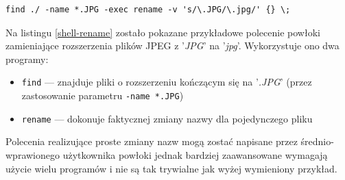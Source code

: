 \begin{lstlisting}[label=shell-rename, caption={Polecenie powłoki zmieniające roszerzenia plików JPEG}]
find ./ -name *.JPG -exec rename -v 's/\.JPG/\.jpg/' {} \;
\end{lstlisting}

\par
Na listingu \ref{shell-rename} zostało pokazane przykładowe polecenie powłoki zamieniające rozszerzenia plików JPEG z '\textit{JPG}' na '\textit{jpg}'.
Wykorzystuje ono dwa programy:
\begin{itemize}
\item \texttt{find} --- znajduje pliki o rozszerzeniu kończącym się na '\textit{.JPG}' (przez zastosowanie parametru \texttt{-name *.JPG})
\item \texttt{rename} --- dokonuje faktycznej zmiany nazwy dla pojedynczego pliku
\end{itemize}
Polecenia realizujące proste zmiany nazw mogą zostać napisane przez średnio-wprawionego użytkownika powłoki jednak bardziej zaawansowane wymagają użycie wielu programów i nie są tak trywialne jak wyżej wymieniony przykład.
